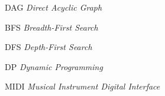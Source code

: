 \begin{siglas}
  \item[DAG] \textit{Direct Acyclic Graph}
  \item[BFS] \textit{Breadth-First Search}
  \item[DFS] \textit{Depth-First Search}
  \item[DP] \textit{Dynamic Programming}
  \item[MIDI] \textit{Musical Instrument Digital Interface}
\end{siglas}
